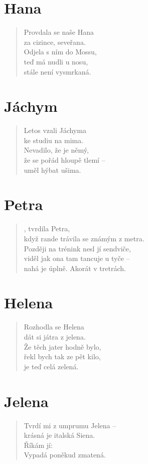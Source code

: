 \section*{Hana}
\begin{verse}
Provdala se naše Hana\\
za cizince, seveřana.\\
Odjela s ním do Mossu,\\
teď má nudli u nosu,\\
stále není vysmrkaná.
\end{verse}

\section*{Jáchym}
\begin{verse}
Letos vzali Jáchyma\\
ke studiu na mima.\\
Nevadilo, že je němý,\\
že se pořád hloupě tlemí --\\
uměl hýbat ušima.
\end{verse}

\section*{Petra}
\begin{verse}
, tvrdila Petra,\\
když rande trávila se známým z metra.\\
Později na trénink nesl jí sendviče,\\
viděl jak ona tam tancuje u tyče --\\
nahá je úplně. Akorát v tretrách.
\end{verse}

\section*{Helena}
\begin{verse}
Rozhodla se Helena\\
dát si játra z jelena.\\
Že těch jater hodně bylo,\\
řekl bych tak ze pět kilo,\\
je teď celá zelená.
\end{verse}

\section*{Jelena}
\begin{verse}
Tvrdí mi z umprumu Jelena --\\
krásná je italská Siena.\\
Říkám jí: \\
Vypadá poněkud zmatená.
\end{verse}

